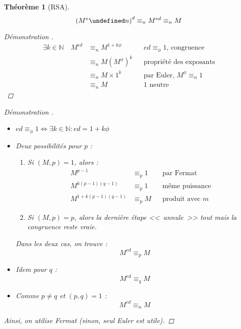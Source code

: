 \documentclass[11pt,twocolumn]{article}
\let\mod\undefined
\DeclareMathOperator{\mod}{mod}
\theoremstyle{plain}
\newtheorem{thm}{Théorème}
\newcommand{\esN}{\mathbb{N}} %
\newcommand{\dbi}{\Longleftrightarrow}
\newenvironment{cproof}[1]{\begin{proof}[Démonstration \cite{#1}]}{\end{proof}}
\begin{document}
\begin{thm}[RSA]
	\[
		\left(M^e \mod n\right)^d \equiv_n M^{ed} \equiv_n M
	\]
	\begin{cproof}{Buys}
		\begin{align*}
			\exists k \in \esN \quad M^{ed}
			&\equiv_n M^{1+k\phi}
				&& ed\equiv_\phi1 \text{, congruence} \\
			&\equiv_n M\left(M^\phi\right)^k
				&& \text{propriété des exposants} \\
			&\equiv_n M \times 1^k
				&& \text{par Euler, } M^\phi\equiv_n 1 \\
			&\equiv_n M
				&& \text{1 neutre}
		\end{align*}
	\end{cproof}
	\begin{cproof}{hac} ~
		\begin{itemize}
			\item $ed\equiv_\phi1 \dbi \exists k \in \esN : ed=1+k\phi$
			\item Deux possibilités pour $p$ :
				\begin{enumerate}
					\item Si $(M,p)=1$, alors :
						\begin{align*}
							M^{p-1} &\equiv_p 1
								&& \text{par Fermat} \\
							M^{k\left(p-1\right)\left(q-1\right)} &\equiv_p 1
								&& \text{même puissance} \\
							M^{1+k\left(p-1\right)\left(q-1\right)} &\equiv_p M
								&& \text{produit avec }m
						\end{align*}
					\item Si $(M,p)=p$, alors la dernière étape <<~annule~>>
						tout mais la congruence reste vraie.
				\end{enumerate}
				Dans les deux cas, on trouve : \[
					M^{ed} \equiv_p M
				\]
			\item Idem pour $q$ : \[
					M^{ed} \equiv_q M
				\]
			\item Comme $p \neq q$ et $(p,q)=1$ : \[
					M^{ed} \equiv_n M
			\]
		\end{itemize}
		\emph{Ainsi, on utilise Fermat (sinon, seul Euler est utile).}
	\end{cproof}
\end{thm}
\end{document}
